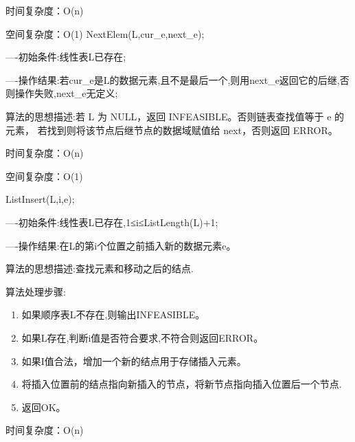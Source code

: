 \documentclass[supercite]{Experimental_Report}
\theoremstyle{definition}
\begin{document}
时间复杂度：O(n)

空间复杂度：O(1)
NextElem(L,cur\_e,next\_e);

----初始条件:线性表L已存在;

----操作结果:若cur\_e是L的数据元素,且不是最后一个,则用next\_e返回它的后继,否则操作失败,next\_e无定义;

算法的思想描述:若 L 为 NULL，返回 INFEASIBLE。否则链表查找值等于 e 的元素，
若找到则将该节点后继节点的数据域赋值给 next，否则返回 ERROR。	

时间复杂度：O(n)

空间复杂度：O(1)

ListInsert(L,i,e);

----初始条件:线性表L已存在,1≤i≤ListLength(L)+1;

----操作结果:在L的第i个位置之前插入新的数据元素e。

算法的思想描述:查找元素和移动之后的结点.

算法处理步骤:
\begin{enumerate}
	\renewcommand{\labelenumi}{\theenumi)}
	\item 如果顺序表L不存在,则输出INFEASIBLE。
	\item 如果L存在,判断i值是否符合要求,不符合则返回ERROR。
	\item 如果I值合法，增加一个新的结点用于存储插入元素。
	\item 将插入位置前的结点指向新插入的节点，将新节点指向插入位置后一个节点.
	\item 返回OK。
\end{enumerate}

时间复杂度：O(n)
\end{document}
